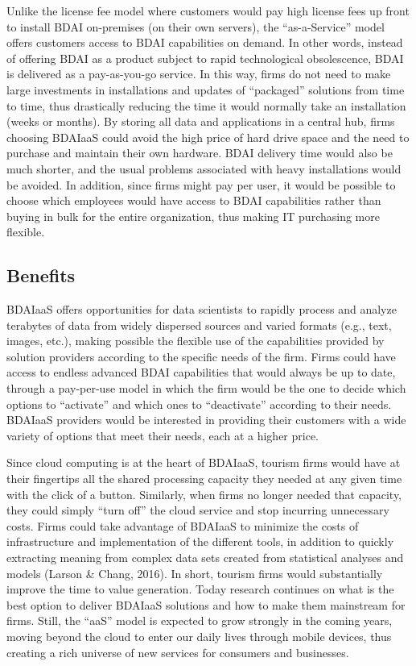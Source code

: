 \documentclass[
  letterpaper,
  DIV=11,
  numbers=noendperiod]{scrreprt}
\begin{document}
Unlike the license fee model where customers would pay high license fees
up front to install BDAI on-premises (on their own servers), the
``as-a-Service'' model offers customers access to BDAI capabilities on
demand. In other words, instead of offering BDAI as a product subject to
rapid technological obsolescence, BDAI is delivered as a pay-as-you-go
service. In this way, firms do not need to make large investments in
installations and updates of ``packaged'' solutions from time to time,
thus drastically reducing the time it would normally take an
installation (weeks or months). By storing all data and applications in
a central hub, firms choosing BDAIaaS could avoid the high price of hard
drive space and the need to purchase and maintain their own hardware.
BDAI delivery time would also be much shorter, and the usual problems
associated with heavy installations would be avoided. In addition, since
firms might pay per user, it would be possible to choose which employees
would have access to BDAI capabilities rather than buying in bulk for
the entire organization, thus making IT purchasing more flexible.

\hypertarget{benefits-3}{%
\subsection{Benefits}\label{benefits-3}}

BDAIaaS offers opportunities for data scientists to rapidly process and
analyze terabytes of data from widely dispersed sources and varied
formats (e.g., text, images, etc.), making possible the flexible use of
the capabilities provided by solution providers according to the
specific needs of the firm. Firms could have access to endless advanced
BDAI capabilities that would always be up to date, through a pay-per-use
model in which the firm would be the one to decide which options to
``activate'' and which ones to ``deactivate'' according to their needs.
BDAIaaS providers would be interested in providing their customers with
a wide variety of options that meet their needs, each at a higher price.

Since cloud computing is at the heart of BDAIaaS, tourism firms would
have at their fingertips all the shared processing capacity they needed
at any given time with the click of a button. Similarly, when firms no
longer needed that capacity, they could simply ``turn off'' the cloud
service and stop incurring unnecessary costs. Firms could take advantage
of BDAIaaS to minimize the costs of infrastructure and implementation of
the different tools, in addition to quickly extracting meaning from
complex data sets created from statistical analyses and models (Larson
\& Chang, 2016). In short, tourism firms would substantially improve the
time to value generation. Today research continues on what is the best
option to deliver BDAIaaS solutions and how to make them mainstream for
firms. Still, the ``aaS'' model is expected to grow strongly in the
coming years, moving beyond the cloud to enter our daily lives through
mobile devices, thus creating a rich universe of new services for
consumers and businesses.
\end{document}
